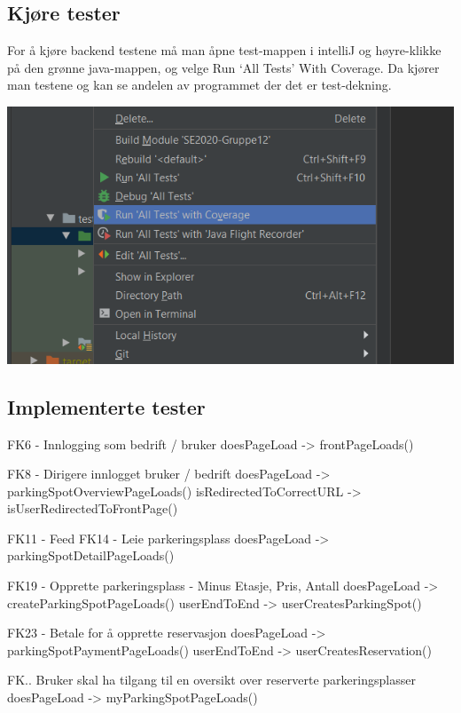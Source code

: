 \documentclass[12pt]{article}
\begin{document}
    \subsection{Kjøre tester}
    For å kjøre backend testene må man åpne test-mappen i intelliJ og høyre-klikke på den grønne java-mappen, og velge Run ‘All Tests’ With Coverage. Da kjører man testene og kan se andelen av programmet der det er test-dekning.

    \includegraphics[scale=1]{bilder/prototypen/testveiledning.png}

    \subsection{Implementerte tester}


    FK6 - Innlogging som bedrift / bruker
        doesPageLoad        
        -> frontPageLoads()

    FK8 - Dirigere innlogget bruker / bedrift
        doesPageLoad
        -> parkingSpotOverviewPageLoads()
        isRedirectedToCorrectURL
        -> isUserRedirectedToFrontPage()

        FK11 - Feed
    FK14 - Leie parkeringsplass
        doesPageLoad
        -> parkingSpotDetailPageLoads()
    
    FK19 - Opprette parkeringsplass
            - Minus Etasje, Pris, Antall
        doesPageLoad
        -> createParkingSpotPageLoads()
        userEndToEnd
        -> userCreatesParkingSpot()

    FK23 - Betale for å opprette reservasjon
        doesPageLoad
        -> parkingSpotPaymentPageLoads()
        userEndToEnd
        -> userCreatesReservation()

    FK.. Bruker skal ha tilgang til en oversikt over reserverte parkeringsplasser
        doesPageLoad
        -> myParkingSpotPageLoads()
\end{document}
